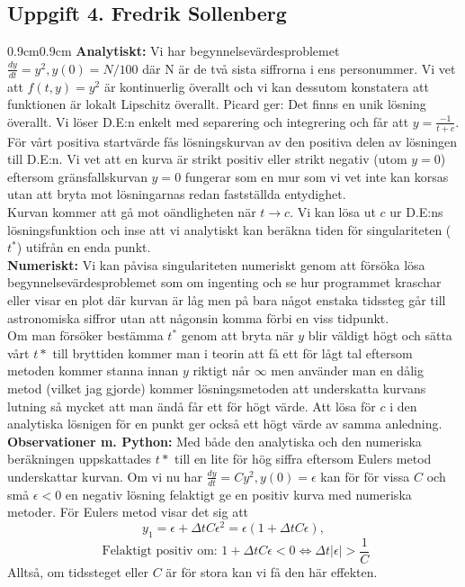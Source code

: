 \documentclass{article}
\begin{document}
\subsection*{Uppgift 4. Fredrik Sollenberg}
\begin{adjustwidth}{0.9cm}{0.9cm}
\textbf{Analytiskt:} Vi har begynnelsevärdesproblemet $\frac{dy}{dt}=y^2,y(0)=N/100$ där N är de två sista siffrorna i ens personummer. Vi vet att $f(t,y)=y^2$ är kontinuerlig överallt och vi kan dessutom konstatera att funktionen är lokalt Lipschitz överallt. Picard ger: Det finns en unik lösning överallt. Vi löser D.E:n enkelt med separering och integrering och får att $y=\frac{-1}{t+c}$. För vårt positiva startvärde fås lösningskurvan av den positiva delen av lösningen till D.E:n. Vi vet att en kurva är strikt positiv eller strikt negativ (utom $y=0$) eftersom gränsfallskurvan $y=0$ fungerar som en mur som vi vet inte kan korsas utan att bryta mot lösningarnas redan fastställda entydighet.
\medskip\\
Kurvan kommer att gå mot oändligheten när $t\to c$. Vi kan lösa ut $c$ ur D.E:ns lösningsfunktion och inse att vi analytiskt kan beräkna tiden för singulariteten ($t^*$) utifrån en enda punkt. 
\medskip\\
\textbf{Numeriskt:} Vi kan påvisa singulariteten numeriskt genom att försöka lösa begynnelsevärdesproblemet som om ingenting och se hur programmet kraschar eller visar en plot där kurvan är låg men på bara något enstaka tidssteg går till astronomiska siffror utan att någonsin komma förbi en viss tidpunkt.
\medskip\\
Om man försöker bestämma $t^*$ genom att bryta när $y$ blir väldigt högt och sätta vårt $t*$ till bryttiden kommer man i teorin att få ett för lågt tal eftersom metoden kommer stanna innan $y$ riktigt når $\infty$ men använder man en dålig metod (vilket jag gjorde) kommer lösningsmetoden att underskatta kurvans lutning så mycket att man ändå får ett för högt värde. Att lösa för $c$ i den analytiska lösnigen för en punkt ger också ett högt värde av samma anledning.
\medskip\\
\textbf{Observationer m. Python:} Med både den analytiska och den numeriska beräkningen uppskattades $t*$ till en lite för hög siffra eftersom Eulers metod underskattar kurvan. Om vi nu har $\frac{dy}{dt}=Cy^2,y(0)=\epsilon$ kan för för vissa $C$ och små $\epsilon <0$ en negativ lösning felaktigt ge en positiv kurva med numeriska metoder. För Eulers metod visar det sig att
\[
y_{1}=\epsilon + \Delta tC\epsilon^2 = \epsilon(1+\Delta tC\epsilon), 
\]
\[
\text{ Felaktigt positiv om: }1+\Delta tC\epsilon<0\Leftrightarrow \Delta t|\epsilon| > \frac{1}{C}
\]
Alltså, om tidssteget eller $C$ är för stora kan vi få den här effekten. 
\end{adjustwidth}
\end{document}
